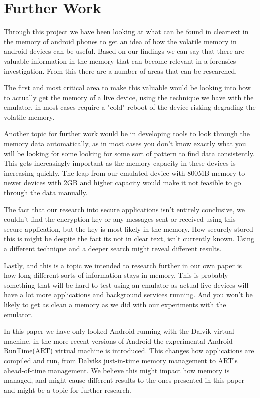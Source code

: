 \section{Further Work}
Through this project we have been looking at what can be found in cleartext in 
the memory of android phones to get an idea of how the volatile memory in 
android devices  can be useful. Based on our findings we can say that there are
valuable information in the memory that can become relevant in a forensics investigation. 
From this there are a number of areas that can be researched.

The first and most critical area to make this valuable would be looking into how 
to actually get the memory of a live device, using the technique we have with 
the emulator, in most cases require a "cold" reboot of the device risking degrading 
the volatile memory.

Another topic for further work would be in developing tools to look through the 
memory data automatically, as in most cases you don't know exactly what you will 
be looking for some looking for some sort of pattern to find data consistently. 
This gets increasingly important as the memory capacity in these devices is increasing 
quickly. The leap from our emulated device with 800MB memory to newer devices 
with 2GB and higher capacity would make it not feasible to go through the data manually.

The fact that our research into secure applications isn't entirely conclusive, we
couldn't find the encryption key or any messages sent or received using this 
secure application, but the key is most likely in the memory. How 
securely stored this is might be despite the fact its not in clear text, 
isn't currently known. Using a different technique and a deeper search might 
reveal different results.

Lastly, and this is a topic we intended to research further in our own paper is 
how long different sorts of information stays in memory. This is probably 
something that will be hard to test using an emulator as actual live devices will 
have a lot more applications and background services running. And you won't be likely to 
get as clean a memory as we did with our experiments with the emulator. 

In this paper we have only looked Android running with the Dalvik virtual machine, 
in the more recent versions of Android the experimental Android RunTime(ART) 
virtual machine is introduced. This changes how applications are compiled and run, from 
Dalviks just-in-time memory management to ART’s ahead-of-time management. We 
believe this might impact how memory is managed, and might cause different 
results to the ones presented in this paper and might be a topic for further research. \\